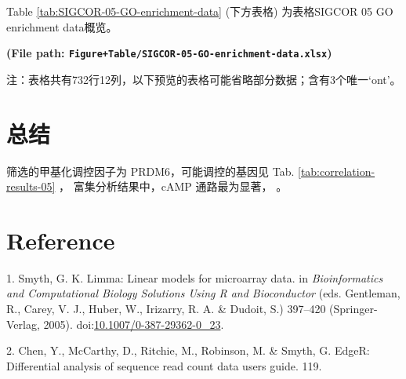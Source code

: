 \documentclass[
]{article}
\newenvironment{cslreferences}%
  {}%
  {\par}
\begin{document}
Table \ref{tab:SIGCOR-05-GO-enrichment-data} (下方表格) 为表格SIGCOR 05 GO enrichment data概览。

\textbf{(File path: \texttt{Figure+Table/SIGCOR-05-GO-enrichment-data.xlsx})}

\begin{center}\begin{tcolorbox}[colback=gray!10, colframe=gray!50, width=0.9\linewidth, arc=1mm, boxrule=0.5pt]注：表格共有732行12列，以下预览的表格可能省略部分数据；含有3个唯一`ont'。
\end{tcolorbox}
\end{center}

\begin{center}\vspace{1.5cm}\end{center}

\hypertarget{conclusion}{%
\section{总结}\label{conclusion}}

筛选的甲基化调控因子为 PRDM6，可能调控的基因见 Tab. \ref{tab:correlation-results-05} ，
富集分析结果中，cAMP 通路最为显著， 。

\hypertarget{bibliography}{%
\section*{Reference}\label{bibliography}}

\hypertarget{refs}{}
\begin{cslreferences}
\leavevmode\hypertarget{ref-LimmaLinearMSmyth2005}{}%
1. Smyth, G. K. Limma: Linear models for microarray data. in \emph{Bioinformatics and Computational Biology Solutions Using R and Bioconductor} (eds. Gentleman, R., Carey, V. J., Huber, W., Irizarry, R. A. \& Dudoit, S.) 397--420 (Springer-Verlag, 2005). doi:\href{https://doi.org/10.1007/0-387-29362-0_23}{10.1007/0-387-29362-0\_23}.

\leavevmode\hypertarget{ref-EdgerDifferenChen}{}%
2. Chen, Y., McCarthy, D., Ritchie, M., Robinson, M. \& Smyth, G. EdgeR: Differential analysis of sequence read count data users guide. 119.
\end{cslreferences}
\end{document}
